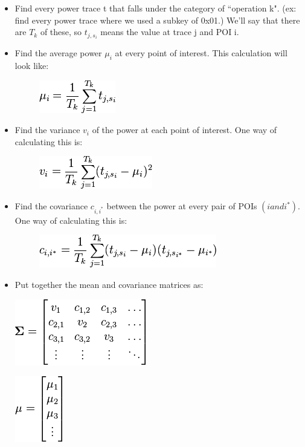     \begin{itemize}
      \item Find every power trace t that falls under the category of ``operation k". (ex: find every power trace where we used a subkey of 0x01.) We'll say that there are $T_k$ of these, so $t_{j, s_i}$ means the value at trace j and POI i.
      \item Find the average power $\mu_i$ at every point of interest. This calculation will look like:
      \begin{figure}[htp]
      \centering
      \includegraphics{images/Lecture_5/pc1.png}
      \end{figure}
       
      \item Find the variance $v_i$ of the power at each point of interest. One way of calculating this is:
      \begin{figure}[htp]
      \centering
      \includegraphics{images/Lecture_5/pic2.png}
      \end{figure}
    
      \item Find the covariance $c_{i, i^*}$ between the power at every pair of POIs $(i and i^*)$. One way of calculating this is:
      \begin{figure}[htp]
      \centering
      \includegraphics{images/Lecture_5/pic3.png}
      \end{figure}
      \item Put together the mean and covariance matrices as:
    
      \begin{minipage}{\linewidth}
      \centering
      \includegraphics{images/Lecture_5/pic5.png}
      \end{minipage}
      \begin{minipage}{\linewidth}
      \centering
      \includegraphics{images/Lecture_5/pic4.png}
      \end{minipage}
      

\end{itemize}
